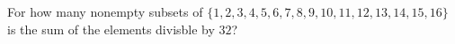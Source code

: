 For how many nonempty subsets of $\{1, 2, 3, 4, 5, 6, 7, 8, 9, 10, 11, 12, 13, 14, 15, 16\}$ is the sum of the elements divisble by $32$?
